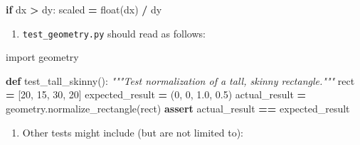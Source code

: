 \documentclass[
]{krantz}
\makeatletter
\newenvironment{Shaded}{\begin{snugshade}}{\end{snugshade}}
\newcommand{\BuiltInTok}[1]{#1}
\newcommand{\CommentTok}[1]{\textcolor[rgb]{0.56,0.35,0.01}{\textit{#1}}}
\newcommand{\ControlFlowTok}[1]{\textcolor[rgb]{0.13,0.29,0.53}{\textbf{#1}}}
\newcommand{\DecValTok}[1]{\textcolor[rgb]{0.00,0.00,0.81}{#1}}
\newcommand{\FloatTok}[1]{\textcolor[rgb]{0.00,0.00,0.81}{#1}}
\newcommand{\ImportTok}[1]{#1}
\newcommand{\KeywordTok}[1]{\textcolor[rgb]{0.13,0.29,0.53}{\textbf{#1}}}
\newcommand{\NormalTok}[1]{#1}
\newcommand{\OperatorTok}[1]{\textcolor[rgb]{0.81,0.36,0.00}{\textbf{#1}}}
\providecommand{\tightlist}{%
  \setlength{\itemsep}{0pt}\setlength{\parskip}{0pt}}
\newenvironment{kframe}{%
\medskip{}
\setlength{\fboxsep}{.8em}
 \def\at@end@of@kframe{}%
 \ifinner\ifhmode%
  \def\at@end@of@kframe{\end{minipage}}%
  \begin{minipage}{\columnwidth}%
 \fi\fi%
 \def\FrameCommand##1{\hskip\@totalleftmargin \hskip-\fboxsep
 \colorbox{shadecolor}{##1}\hskip-\fboxsep
     \hskip-\linewidth \hskip-\@totalleftmargin \hskip\columnwidth}%
 \MakeFramed {\advance\hsize-\width
   \@totalleftmargin\z@ \linewidth\hsize
   \@setminipage}}%
 {\par\unskip\endMakeFramed%
 \at@end@of@kframe}
\renewenvironment{Shaded}{\begin{kframe}}{\end{kframe}}
\makeatother
\begin{document}
\begin{Shaded}
\begin{Highlighting}[]
\ControlFlowTok{if}\NormalTok{ dx }\OperatorTok{\textgreater{}}\NormalTok{ dy:}
\NormalTok{    scaled }\OperatorTok{=} \BuiltInTok{float}\NormalTok{(dx) }\OperatorTok{/}\NormalTok{ dy}
\end{Highlighting}
\end{Shaded}

\begin{enumerate}
\def\labelenumi{\arabic{enumi}.}
\setcounter{enumi}{3}
\tightlist
\item
  \texttt{test\_geometry.py} should read as follows:
\end{enumerate}

\begin{Shaded}
\begin{Highlighting}[]
\ImportTok{import}\NormalTok{ geometry}

\KeywordTok{def}\NormalTok{ test\_tall\_skinny():}
    \CommentTok{"""Test normalization of a tall, skinny rectangle."""}
\NormalTok{    rect }\OperatorTok{=}\NormalTok{ [}\DecValTok{20}\NormalTok{, }\DecValTok{15}\NormalTok{, }\DecValTok{30}\NormalTok{, }\DecValTok{20}\NormalTok{]}
\NormalTok{    expected\_result }\OperatorTok{=}\NormalTok{ (}\DecValTok{0}\NormalTok{, }\DecValTok{0}\NormalTok{, }\FloatTok{1.0}\NormalTok{, }\FloatTok{0.5}\NormalTok{)}
\NormalTok{    actual\_result }\OperatorTok{=}\NormalTok{ geometry.normalize\_rectangle(rect)}
    \ControlFlowTok{assert}\NormalTok{ actual\_result }\OperatorTok{==}\NormalTok{ expected\_result}
\end{Highlighting}
\end{Shaded}

\begin{enumerate}
\def\labelenumi{\arabic{enumi}.}
\setcounter{enumi}{4}
\tightlist
\item
  Other tests might include (but are not limited to):
\end{enumerate}
\end{document}
